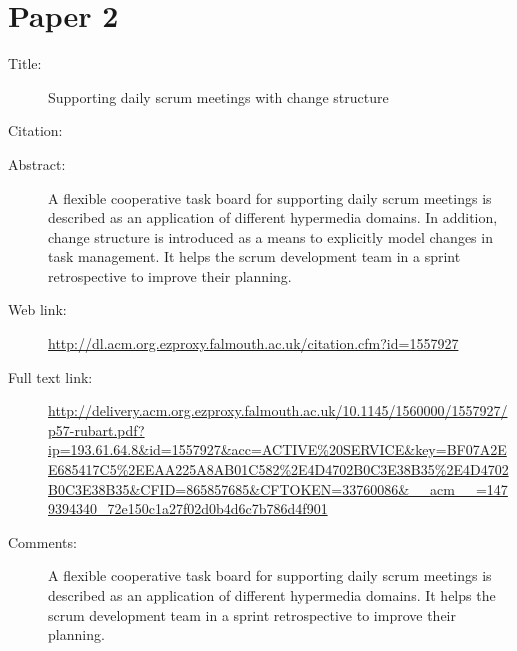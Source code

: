 \documentclass{scrartcl}
\begin{document}
\section*{Paper 2}
\begin{description}
\item[Title:] Supporting daily scrum meetings with change structure
\item[Citation:] \cite{SupportingScrum}
\item[Abstract:] A flexible cooperative task board for supporting daily scrum meetings is described as an application of different hypermedia domains. In addition, change structure is introduced as a means to explicitly model changes in task management. It helps the scrum development team in a sprint retrospective to improve their planning.
\item[Web link:] \url{http://dl.acm.org.ezproxy.falmouth.ac.uk/citation.cfm?id=1557927}
\item[Full text link:] \url{http://delivery.acm.org.ezproxy.falmouth.ac.uk/10.1145/1560000/1557927/p57-rubart.pdf?ip=193.61.64.8&id=1557927&acc=ACTIVE%20SERVICE&key=BF07A2EE685417C5%2EEAA225A8AB01C582%2E4D4702B0C3E38B35%2E4D4702B0C3E38B35&CFID=865857685&CFTOKEN=33760086&__acm__=1479394340_72e150c1a27f02d0b4d6c7b786d4f901}
\item[Comments:] A flexible cooperative task board for supporting daily scrum meetings is described as an application of different hypermedia domains. It helps the scrum development team in a sprint retrospective to improve their planning.
\end{description}
\end{document}

